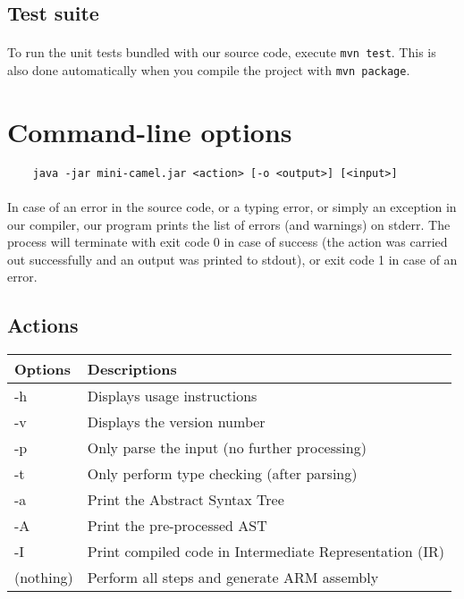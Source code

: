 \documentclass[a4paper,10pt]{article}
\begin{document}
	\subsection{Test suite}
	
    	\paragraph{}
        	To run the unit tests bundled with our source code, execute \texttt{mvn test}. This is also done automatically when you compile the project with \texttt{mvn package}.
    
\section{Command-line options}
	\begin{lstlisting}
    java -jar mini-camel.jar <action> [-o <output>] [<input>]\end{lstlisting}
	\paragraph{}
    	In case of an error in the source code, or a typing error, or simply an exception in our compiler, our program prints the list of errors (and warnings) on stderr. The process will terminate with exit code 0 in case of success (the action was carried out successfully and an output was printed to stdout), or exit code 1 in case of an error.
    
	\subsection{Actions}
		\begin{tabular}{|R{2.3cm}|C{9cm}|}
		\hline {}Options & Descriptions \\
		\hline   -h & Displays usage instructions \\
		\hline   -v & Displays the version number \\
		\hline   -p & Only parse the input (no further processing) \\
		\hline   -t & Only perform type checking (after parsing) \\
		\hline   -a & Print the Abstract Syntax Tree \\
		\hline   -A & Print the pre-processed AST \\
		\hline   -I & Print compiled code in Intermediate Representation (IR) \\
		\hline (nothing) & Perform all steps and generate ARM assembly \\
		\hline 
		\end{tabular}
	
\end{document}
